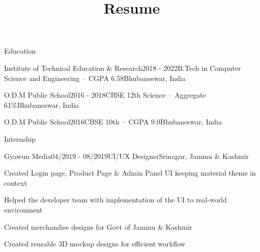 \documentclass{resumeclass} %
\begin{document}
\title{Resume}


\begin{rSection}{Education}
\begin{rSubsection}{Institute of Technical Education \& Research}{2018 - 2022}{B.Tech in Computer Science and Engineering~$\cdot$~CGPA 6.58}{Bhubaneswar, India}
\vspace{-.65cm}
\item[]
\end{rSubsection}
\begin{rSubsection}{O.D.M Public School}{2016 - 2018}{CBSE 12th Science~$\cdot$~Aggregate 61\%}{Bhubaneswar, India}
\end{rSubsection}
\begin{rSubsection}{O.D.M Public School}{2016}{CBSE 10th~$\cdot$~CGPA 9.0}{Bhubaneswar, India}

\end{rSubsection}
\end{rSection}



\begin{rSection}{Internship}
\begin{rSubsection}{Gyawun Media}{04/2019 - 08/2019}{UI/UX Designer}{Srinagar, Jammu \& Kashmir}

\item Created Login page, Product Page \& Admin Panel UI keeping material theme in context
\item Helped the developer team with implementation of the UI to real-world environment
\item Created merchandise designs for Govt of Jammu \& Kashmir
\item Created reusable 3D mockup designs for efficient workflow

\end{rSubsection}
\end{rSection}
\end{document}
